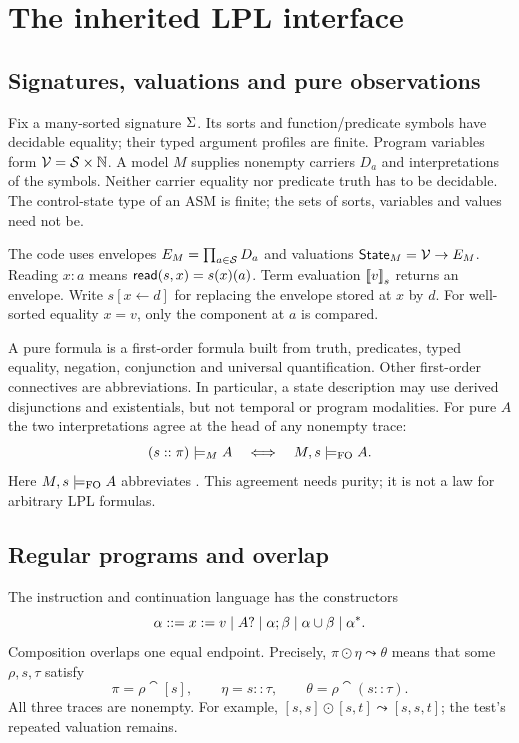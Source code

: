 \section{The inherited LPL interface}\label{sec:foundations}

\subsection{Signatures, valuations and pure observations}
Fix a many-sorted signature $\Sigma$. Its sorts and function/predicate symbols
have decidable equality; their typed argument profiles are finite. Program
variables form $\mathcal{V}=\mathcal{S}\times\mathbb{N}$. A model $M$ supplies nonempty carriers
$D_a$ and interpretations of the symbols. Neither carrier equality nor
predicate truth has to be decidable. The control-state type of an ASM is
finite; the sets of sorts, variables and values need not be.

The code uses envelopes $E_M=\prod_{a\in\mathcal{S}}D_a$ and valuations
$\mathsf{State}_M=\mathcal{V}\to E_M$. Reading $x:a$ means
$\mathsf{read}(s,x)=s(x)(a)$. Term evaluation $\mathopen{[\![}v\mathclose{]\!]}_{s}$ returns an envelope.
Write $s[x\leftarrow d]$ for replacing the envelope stored at $x$ by $d$.
For well-sorted equality $x=v$, only the component at $a$ is compared.

A pure formula is a first-order formula built from truth, predicates,
typed equality, negation, conjunction and universal quantification.
Other first-order connectives are abbreviations. In particular, a state
description may use derived disjunctions and existentials, but not temporal
or program modalities. For pure $A$ the two interpretations agree at the
head of any nonempty trace:
\[
 (s::\pi)\models_M A\quad\Longleftrightarrow\quad M,s\models_{\rm FO}A.
\]
Here $M,s\models_{\rm FO}A$ abbreviates .
This agreement needs purity; it is not a law for arbitrary LPL formulas.

\subsection{Regular programs and overlap}
The instruction and continuation language has the constructors
\[
 \alpha\mathrel{::=} x:=v\mid A?\mid\alpha;\beta
               \mid\alpha\cup\beta\mid\alpha^*.
\]
Composition overlaps one equal endpoint. Precisely,
$\pi\odot\eta\leadsto\theta$ means that some $\rho,s,\tau$ satisfy
\[
 \pi=\rho\cat[s],\qquad \eta=s::\tau,\qquad
 \theta=\rho\cat(s::\tau).
\]
All three traces are nonempty. For example,
$[s,s]\odot[s,t]\leadsto[s,s,t]$; the test's repeated valuation remains.

